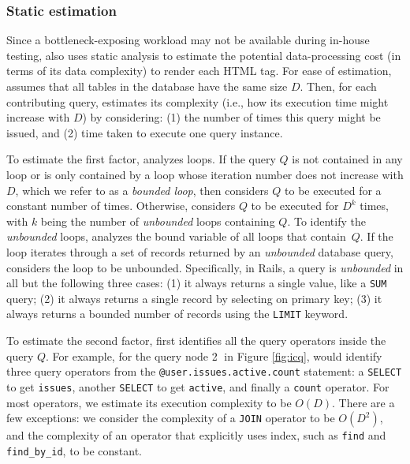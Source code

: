 \subsubsection{Static estimation}
\label{sec:profile_static}
Since a bottleneck-exposing workload may not be available during in-house testing, \ToolP also
uses static analysis to estimate the potential data-processing cost (in terms of its data complexity) to render each HTML tag.
For ease of estimation, \ToolP assumes that all tables in the database have the same size $D$. 
Then, for each contributing query, \ToolP estimates its complexity (i.e., how its execution
time might increase with $D$) by considering:
(1) the number of times this query might be issued, and
(2) time taken to execute one query instance.

To estimate the first factor, \ToolP analyzes loops.
If the query $Q$ is not contained in any loop or is only contained by a loop whose 
iteration number does not increase with $D$, which we refer to as a {\it bounded loop}, 
\ToolP then considers $Q$ to be executed for a constant number of times.
Otherwise, \ToolP considers $Q$ to be executed for $D^k$ times, with $k$ being the number of {\it unbounded} loops containing $Q$.
To identify the {\it unbounded} loops, \ToolP analyzes the bound variable 
of all loops that contain\ $Q$.
If the loop iterates through a set of records returned by an 
{\it unbounded} database query,
\ToolP considers the loop to be unbounded.
Specifically, in Rails, a query is {\it unbounded} in all but the following
three cases:
(1) it always returns a single value, like a {\tt SUM} query; 
(2) it always returns a single record by selecting on primary key; %
(3) it always returns a bounded number of records using the {\tt LIMIT} keyword.

To estimate the second factor, \ToolP first identifies all the query operators
inside the query $Q$. For example, for the query node {\large \textcircled{\small 2}} in
Figure \ref{fig:icq}, \ToolP would identify three query operators 
from the {\tt @user.issues.active.count} statement: 
a {\tt SELECT} to get {\tt issues}, 
another {\tt SELECT} to get {\tt active}, and finally a {\tt count} operator.
For most operators, we estimate its execution complexity to be $O(D)$.
There are a few exceptions:
we consider the complexity of a {\tt JOIN} operator to be $O(D^2)$, and 
the complexity of an operator that explicitly uses index, such as
{\tt find} and {\tt find\_by\_id}, to be constant. 

